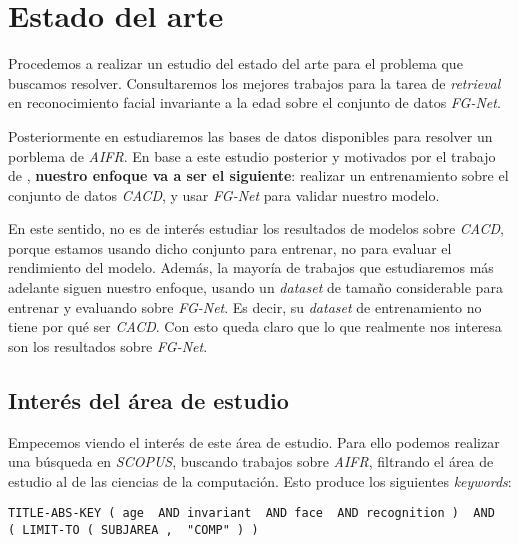\chapter{Estado del arte} \label{ich:estado_arte}

Procedemos a realizar un estudio del estado del arte para el problema que buscamos resolver. Consultaremos los mejores trabajos para la tarea de \textit{retrieval} en reconocimiento facial invariante a la edad sobre el conjunto de datos \textit{FG-Net}.

Posteriormente en  estudiaremos las bases de datos disponibles para resolver un porblema de \textit{AIFR}. En base a este estudio posterior y motivados por el trabajo de \cite{informatica:best_fgnet_model}, \textbf{nuestro enfoque va a ser el siguiente}: realizar un entrenamiento sobre el conjunto de datos \textit{CACD}, y usar \textit{FG-Net} para validar nuestro modelo.

En este sentido, no es de interés estudiar los resultados de modelos sobre \textit{CACD}, porque estamos usando dicho conjunto para entrenar, no para evaluar el rendimiento del modelo. Además, la mayoría de trabajos que estudiaremos más adelante siguen nuestro enfoque, usando un \textit{dataset} de tamaño considerable para entrenar y evaluando sobre \textit{FG-Net}. Es decir, su \textit{dataset} de entrenamiento no tiene por qué ser \textit{CACD}. Con esto queda claro que lo que realmente nos interesa son los resultados sobre \textit{FG-Net}.

\section{Interés del área de estudio} \label{isec:interesareaestudio}

Empecemos viendo el interés de este área de estudio. Para ello podemos realizar una búsqueda en \textit{SCOPUS}, buscando trabajos sobre \textit{AIFR}, filtrando el área de estudio al de las ciencias de la computación. Esto produce los siguientes \textit{keywords}:

\begin{lstlisting}[caption=\textit{Keywords usados para la búsqueda en \textit{SCOPUS}. Búsqueda realizada el 17 de Septiembre de 2023}, label=code:scopus_search, captionpos=b]
    TITLE-ABS-KEY ( age  AND invariant  AND face  AND recognition )  AND  ( LIMIT-TO ( SUBJAREA ,  "COMP" ) )
\end{lstlisting}

